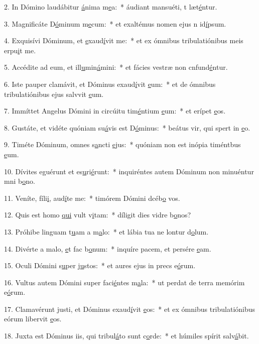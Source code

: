 2. In Dómino laudábitur \uline{á}nima m\uline{e}a:~* áudiant mansuéti, t læt\uline{é}ntur.\par 
3. Magnificáte D\uline{ó}minum m\uline{e}cum:~* et exaltémus nomen ejus n id\uline{í}psum.\par 
4. Exquisívi Dóminum, et \uline{e}xaud\uline{í}vit me:~* et ex ómnibus tribulatiónibus meis erpu\uline{i}t me.\par 
5. Accédite ad eum, et ill\uline{u}min\uline{á}mini:~* et fácies vestræ non cnfund\uline{é}ntur.\par 
6. Iste pauper clamávit, et Dóminus exaud\uline{í}vit \uline{e}um:~* et de ómnibus tribulatiónibus ejus salvvit \uline{e}um.\par 
7. Immíttet Angelus Dómini in circúitu tim\uline{é}ntium \uline{e}um:~* et erípet \uline{e}os.\par 
8. Gustáte, et vidéte quóniam su\uline{á}vis est D\uline{ó}minus:~* beátus vir, qui spert in \uline{e}o.\par 
9. Timéte Dóminum, omnes s\uline{a}ncti \uline{e}jus:~* quóniam non est inópia timéntbus \uline{e}um.\par 
10. Dívites eguérunt et es\uline{u}ri\uline{é}runt:~* inquiréntes autem Dóminum non minuéntur mni b\uline{o}no.\par 
11. Veníte, fíli\uline{i}, aud\uline{í}te me:~* timórem Dómini dcéb\uline{o} vos.\par 
12. Quis est homo \uline{qui} vult v\uline{i}tam:~* díligit dies vidre b\uline{o}nos?\par 
13. Próhibe linguam t\uline{u}am a m\uline{a}lo:~* et lábia tua ne lontur d\uline{o}lum.\par 
14. Divérte a malo, \uline{e}t fac b\uline{o}num:~* inquíre pacem, et persére \uline{e}am.\par 
15. Oculi Dómini s\uline{u}per j\uline{u}stos:~* et aures ejus in precs e\uline{ó}rum.\par 
16. Vultus autem Dómini super faci\uline{é}ntes m\uline{a}la:~* ut perdat de terra memórim e\uline{ó}rum.\par 
17. Clamavérunt justi, et Dóminus exaud\uline{í}vit \uline{e}os:~* et ex ómnibus tribulatiónibus eórum libervit \uline{e}os.\par 
18. Juxta est Dóminus iis, qui tribul\uline{á}to sunt c\uline{o}rde:~* et húmiles spírit salv\uline{á}bit.\par 

